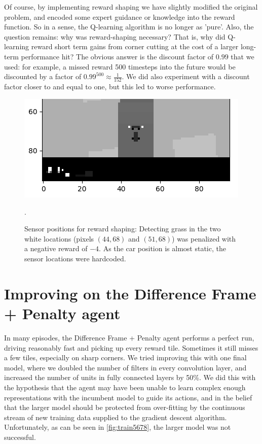 \documentclass[a4paper, 11pt, conference]{ieeeconf}      %
\begin{document}
Of course, by implementing reward shaping we have slightly modified the original problem, and encoded some expert guidance or knowledge into the reward function. So in a sense, the Q-learning algorithm is no longer as 'pure'. Also, the question remains: why was reward-shaping necessary? That is, why did Q-learning reward short term gains from corner cutting at the cost of a larger long-term performance hit? The obvious answer is the discount factor of $0.99$ that we used: for example, a missed reward 500 timesteps into the future would be discounted by a factor of $0.99^500 \approx \frac{1}{152}$. We did also experiment with a discount factor closer to and equal to one, but this led to worse performance.

\begin{figure}
  \includegraphics[width=\linewidth]{figs/reward_shaping_closeup.png}
  \caption{Sensor positions for reward shaping: Detecting grass in the two white locations (pixels $(44, 68)$ and $(51,68)$) was penalized with a negative reward of $-4$. As the car position is almost static, the sensor locations were hardcoded.}.
  \label{fig:reward_shaping}
\end{figure}

\section{Improving on the Difference Frame + Penalty agent}

In many episodes, the Difference Frame + Penalty agent performs a perfect run, driving reasonably fast and picking up every reward tile. Sometimes it still misses a few tiles, especially on sharp corners. We tried improving this with one final model, where we doubled the number of filters in every convolution layer, and increased the number of units in fully connected layers by 50\%. We did this with the hypothesis that the agent may have been unable to learn complex enough representations with the incumbent model to guide its actions, and in the belief that the larger model should be protected from over-fitting by the continuous stream of new training data supplied to the gradient descent algorithm. Unfortunately, as can be seen in \ref{fig:train5678}, the larger model was not successful.
\end{document}
